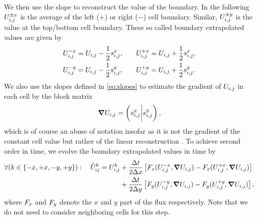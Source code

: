 We then use the slope to reconstruct the value of the boundary.
In the following $U_{i,j}^{\pm x}$ is the average of the left ($+$) or right ($-$) cell boundary.
Similar, $U_{i,j}^{\pm y}$ is the value at the top/bottom cell boundary.
These so called boundary extrapolated values are given by
\newcommand{\extrapolatedCellAvg}[3][i,j]{\cellAvg[#1]^{#3 #2} = \cellAvg #3 \frac{1}{2} \slope{#2}}
\begin{equation}
\begin{alignedat}{2}
& \extrapolatedCellAvg{x}{-} , \qquad && \extrapolatedCellAvg{x}{+}, \\
& \extrapolatedCellAvg{y}{-} , \qquad && \extrapolatedCellAvg{y}{+}.
\end{alignedat}
\end{equation}
We also use the slopes defined in \cref{eq:slopes} to estimate the gradient of $U_{i,j}$ in each cell by the block matrix
\begin{equation}
  \label{eq:muscl-gradient}
  \gradCellAvg = \left( \slope{x} \bigg\rvert \slope{y} \right),
\end{equation}
which is of course an abuse of notation insofar as it is not the gradient of the constant cell value but rather of the linear reconstruction .
To achieve second order in time, we evolve the boundary extrapolated values in time by
\newcommand{\evolvedCellAvg}[2][i,j]{\hat{U}_{#1}^{#2}}
\begin{equation}\label{eq:muscl-time-evolution}
  \begin{split}
  \forall (k \in \{-x, +x, -y, +y \} ): \quad  \hat{U}_{ij}^k = \cellAvg^k &+
  \frac{\Delta t}{2 \Delta x} \left[ \fluxX(\cellAvg^{-x}, \gradCellAvg) - \fluxX(\cellAvg^{+x}, \gradCellAvg) \right] \\&+
  \frac{\Delta t}{2 \Delta y} \left[ \fluxY(\cellAvg^{-y}, \gradCellAvg) - \fluxY(\cellAvg^{+y}, \gradCellAvg) \right],
  \end{split}
\end{equation}
where $F_x$ and $F_y$ denote the $x$ and $y$ part of the flux respectively.
Note that we do not need to consider neighboring cells for this step.

